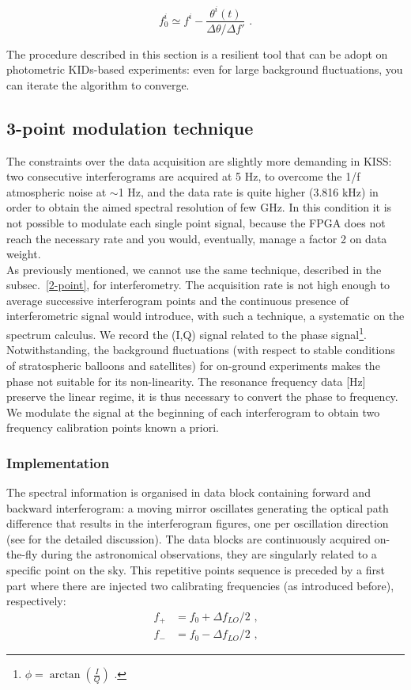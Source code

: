 \documentclass[twocolumn,traditabstract]{aa}\\
\begin{document}
\begin{equation}
f^i_0 \simeq f^i - \frac{\theta^i(t)}{\Delta\theta/\Delta f'} \text{ .}
\end{equation}

The procedure described in this section is a resilient tool that can be adopt on photometric KIDs-based experiments: even for large background fluctuations, you can iterate the algorithm to converge.

\subsection{3-point modulation technique}

The constraints over the data acquisition are slightly more demanding in KISS: two consecutive interferograms are acquired at 5 Hz, to overcome the 1/f atmospheric noise at $\sim$1 Hz, and the data rate is quite higher (3.816 kHz) in order to obtain the aimed spectral resolution of few GHz. In this condition it is not possible to modulate each single point signal, because the FPGA does not reach the necessary rate and you would, eventually, manage a factor 2 on data weight.\\
As previously mentioned, we cannot use the same technique, described in the subsec.~\ref{2-point}, for interferometry. The acquisition rate is not high enough to average successive interferogram points and the continuous presence of interferometric signal would introduce, with such a technique, a systematic on the spectrum calculus. We record the (I,Q) signal related to the phase signal\footnote{$\phi = \arctan \left( \frac{I}{Q} \right) $ .}. Notwithstanding, the background fluctuations (with respect to stable conditions of stratospheric balloons and satellites) for on-ground experiments makes the phase not suitable for its non-linearity. The resonance frequency data [Hz] preserve the linear regime, it is thus necessary to convert the phase to frequency. We modulate the signal at the beginning of each interferogram to obtain two frequency calibration points known a priori.

\subsubsection{Implementation}
The spectral information is organised in data block containing forward and backward interferogram: a moving mirror oscillates generating the optical path difference that results in the interferogram figures, one per oscillation direction (see \cite{fasano-ltd} for the detailed discussion). The data blocks are continuously acquired on-the-fly during the astronomical observations, they are singularly related to a specific point on the sky. This repetitive points sequence is preceded by a first part where there are injected two calibrating frequencies (as introduced before), respectively:
\begin{equation}
\begin{align}
f_+ &= f_0 + \Delta f_{LO}/2 	\text{ ,}
\\
f_- &= f_0 - \Delta f_{LO}/2	\text{ ,}
\end{align}
\label{eq:fmod}
\end{equation}
\end{document}
